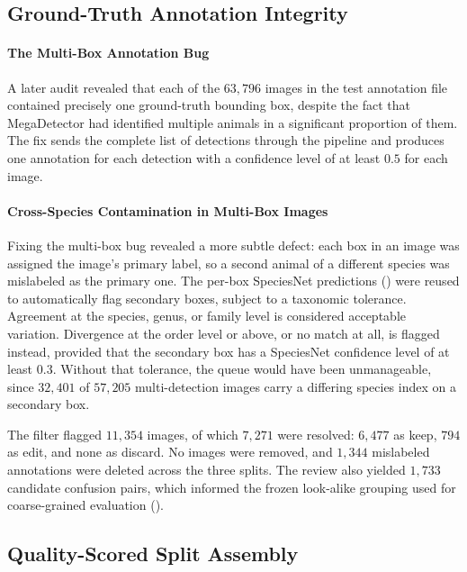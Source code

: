 \subsection{Ground-Truth Annotation Integrity}\label{sec:gt_annotation_integrity}

\paragraph{The Multi-Box Annotation Bug}
A later audit revealed that each of the $63{,}796$ images in the test annotation file contained precisely one ground-truth bounding box, despite the fact that MegaDetector had identified multiple animals in a significant proportion of them. %
The fix sends the complete list of detections through the pipeline and produces one annotation for each detection with a confidence level of at least $0.5$ for each image.

\paragraph{Cross-Species Contamination in Multi-Box Images}
Fixing the multi-box bug revealed a more subtle defect: each box in an image was assigned the image's primary label, so a second animal of a different species was mislabeled as the primary one. The per-box SpeciesNet predictions () were reused to automatically flag secondary boxes, subject to a taxonomic tolerance. Agreement at the species, genus, or family level is considered acceptable variation. Divergence at the order level or above, or no match at all, is flagged instead, provided that the secondary box has a SpeciesNet confidence level of at least $0.3$. Without that tolerance, the queue would have been unmanageable, since $32{,}401$ of $57{,}205$ multi-detection images carry a differing species index on a secondary box.

The filter flagged $11{,}354$ images, of which $7{,}271$ were resolved: $6{,}477$ as keep, $794$ as edit, and none as discard. No images were removed, and $1{,}344$ mislabeled annotations were deleted across the three splits. The review also yielded $1{,}733$ candidate confusion pairs, which informed the frozen look-alike grouping used for coarse-grained evaluation ().

\subsection{Quality-Scored Split Assembly}\label{sec:quality_scoring_splits}


